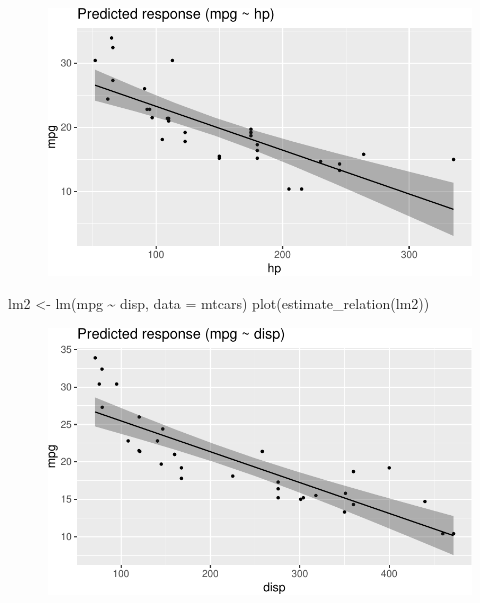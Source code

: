 \documentclass[
  letterpaper,
  DIV=11,
  numbers=noendperiod]{scrreprt}
\newenvironment{Shaded}{\begin{snugshade}}{\end{snugshade}}
\newcommand{\AttributeTok}[1]{\textcolor[rgb]{0.40,0.45,0.13}{#1}}
\newcommand{\FunctionTok}[1]{\textcolor[rgb]{0.28,0.35,0.67}{#1}}
\newcommand{\NormalTok}[1]{\textcolor[rgb]{0.00,0.23,0.31}{#1}}
\newcommand{\OtherTok}[1]{\textcolor[rgb]{0.00,0.23,0.31}{#1}}
\newcommand{\SpecialCharTok}[1]{\textcolor[rgb]{0.37,0.37,0.37}{#1}}
\theoremstyle{definition}
\theoremstyle{definition}
\theoremstyle{remark}
\begin{document}
\begin{figure}[H]

{\centering \includegraphics{./regression2_files/figure-pdf/unnamed-chunk-6-1.pdf}

}

\end{figure}

\begin{Shaded}
\begin{Highlighting}[]
\NormalTok{lm2 }\OtherTok{\textless{}{-}} \FunctionTok{lm}\NormalTok{(mpg }\SpecialCharTok{\textasciitilde{}}\NormalTok{ disp, }\AttributeTok{data =}\NormalTok{ mtcars)}
\FunctionTok{plot}\NormalTok{(}\FunctionTok{estimate\_relation}\NormalTok{(lm2))}
\end{Highlighting}
\end{Shaded}

\begin{figure}[H]

{\centering \includegraphics{./regression2_files/figure-pdf/unnamed-chunk-6-2.pdf}

}

\end{figure}
\end{document}
